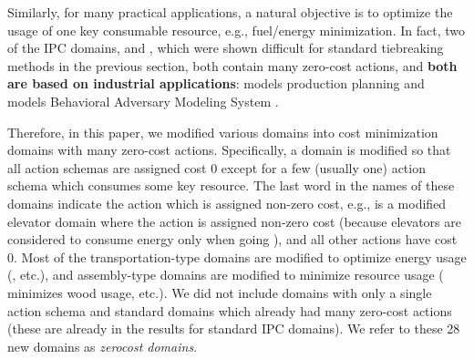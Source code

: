 
Similarly, for many practical applications, a natural objective is to
optimize the usage of one key consumable resource, e.g., fuel/energy
minimization.  In fact, two of the IPC domains,  and
, which were shown difficult for standard tiebreaking
methods in the previous section, both contain many zero-cost actions,
and \textbf{both are based on industrial applications}:  models
production planning \cite{fink1999applications} and 
models Behavioral Adversary Modeling System \cite[minimizing decryption,
data transfer, etc.]{boddy2005course}.

Therefore, in this paper, we modified various domains
into cost minimization domains with many zero-cost actions.
Specifically, a domain is modified so that all action schemas are assigned
cost 0 except for a few (usually one) action schema which consumes some key resource.
The last word in the names of these domains indicate the action which is
assigned non-zero cost, e.g.,  is a modified elevator
domain where the  action is assigned non-zero cost (because
elevators are considered to consume energy only when going ), and all other actions have cost 0.
Most of the transportation-type domains are modified to optimize 
energy usage (,  etc.), and  assembly-type domains are modified to minimize resource usage
( minimizes wood usage, etc.).
We did not
include domains with only a single action schema and standard domains which already had many
zero-cost actions (these are already in the results for standard IPC domains).
We refer to these 28 new domains as \emph{zerocost domains}.


